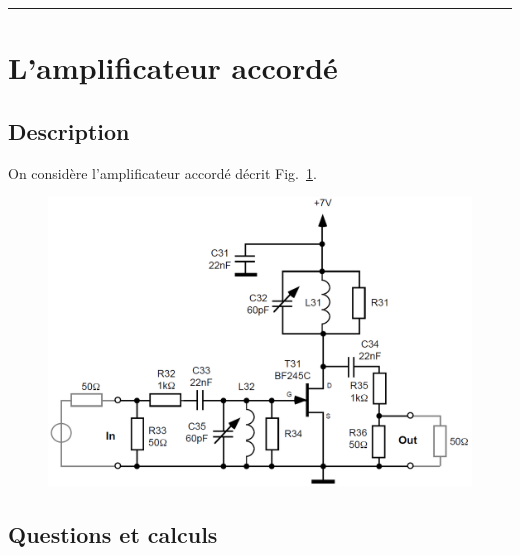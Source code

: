 \documentclass{article}
\begin{document}


\vspace{5pt}\hrule\vspace{2pt}


\vspace{20pt}








\section{L'amplificateur accordé}

\subsection{Description}

On considère l'amplificateur accordé décrit Fig.~\ref{schem6}.

\begin{figure}[h!]
	\centering
	\includegraphics[width=.7\textwidth]{schem6}
	\caption{}
	\label{schem6}
\end{figure}


\subsection{Questions et calculs}

\end{document}
